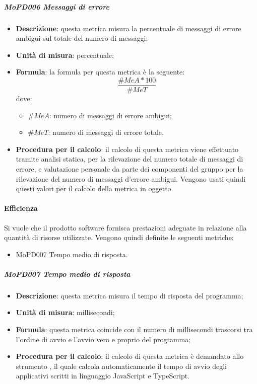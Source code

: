\documentclass[../norme-di-progetto.tex]{subfiles}
\begin{document}
\subparagraph{MoPD006 Messaggi di errore}
\begin{itemize}
  \item \textbf{Descrizione}: questa metrica misura la percentuale di messaggi di errore ambigui sul totale del numero di messaggi;
  \item \textbf{Unità di misura}: percentuale;
  \item \textbf{Formula}: la formula per questa metrica è la seguente:
  \begin{displaymath}
    \frac{\#MeA * 100}{\#MeT}
  \end{displaymath}
  dove:
  \begin{itemize}
    \item $ \#MeA $: numero di messaggi di errore ambigui;
    \item $ \#MeT $: numero di messaggi di errore totale.
  \end{itemize}
  \item \textbf{Procedura per il calcolo}: il calcolo di questa metrica viene effettuato tramite analisi statica, per la rilevazione del numero totale di messaggi di errore, e valutazione personale da parte dei componenti del gruppo per la rilevazione del numero di messaggi d'errore ambigui. Vengono usati quindi questi valori per il calcolo della metrica in oggetto.
\end{itemize}

\paragraph{Efficienza}
Si vuole che il prodotto software fornisca prestazioni adeguate in relazione alla quantità di risorse utilizzate. Vengono quindi definite le seguenti metriche:
\begin{itemize}
  \item MoPD007 Tempo medio di risposta.
\end{itemize}
\subparagraph{MoPD007 Tempo medio di risposta}
\begin{itemize}
  \item \textbf{Descrizione}: questa metrica misura il tempo di risposta del programma;
  \item \textbf{Unità di misura}: millisecondi;
  \item \textbf{Formula}: questa metrica coincide con il numero di millisecondi trascorsi tra l'ordine di avvio e l'avvio vero e proprio del programma;
  \item \textbf{Procedura per il calcolo}: il calcolo di questa metrica è demandato allo strumento , il quale calcola automaticamente il tempo di avvio degli applicativi scritti in linguaggio JavaScript e TypeScript.
\end{itemize}
\end{document}

